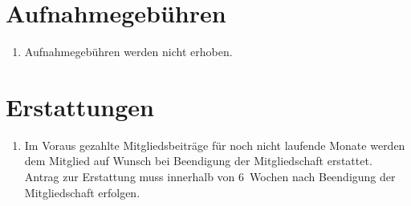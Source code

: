 \documentclass[a4paper,12pt]{scrartcl}
\begin{document}
\section{Aufnahmegebühren}
\begin{enumerate}
  \item Aufnahmegebühren werden nicht erhoben.
\end{enumerate}

\section{Erstattungen}
\begin{enumerate}
  \item Im Voraus gezahlte Mitgliedsbeiträge für noch nicht laufende Monate
    werden dem Mitglied auf Wunsch bei Beendigung der Mitgliedschaft erstattet.
    Antrag zur Erstattung muss innerhalb von 6~Wochen nach Beendigung der
    Mitgliedschaft erfolgen.
\end{enumerate}
\end{document}
